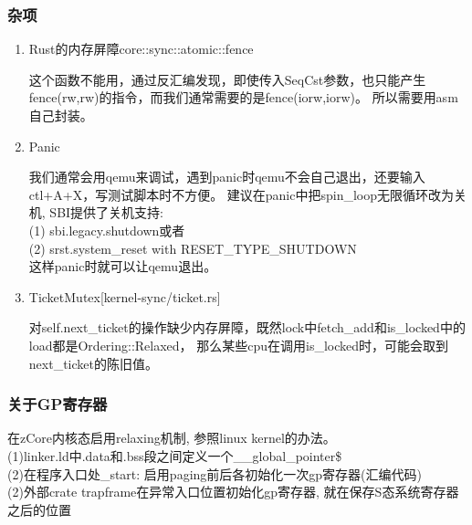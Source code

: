 \documentclass[
8pt, %
]{beamer}
\begin{document}
	\begin{frame}
		\frametitle{杂项}
		\begin{enumerate}
			\item Rust的内存屏障core::sync::atomic::fence\\
			\begin{block}{}
				这个函数不能用，通过反汇编发现，即使传入SeqCst参数，也只能产生fence(rw,rw)的指令，而我们通常需要的是fence(iorw,iorw)。
				所以需要用asm自己封装。
			\end{block}
			\item Panic\\
			\begin{block}{}
				我们通常会用qemu来调试，遇到panic时qemu不会自己退出，还要输入ctl+A+X，写测试脚本时不方便。
				建议在panic中把spin\_loop无限循环改为关机, SBI提供了关机支持:\\
                (1) sbi.legacy.shutdown或者\\
                (2) srst.system\_reset with RESET\_TYPE\_SHUTDOWN\\
                这样panic时就可以让qemu退出。
			\end{block}
			\item TicketMutex[kernel-sync/ticket.rs]
			\begin{block}{}
				对self.next\_ticket的操作缺少内存屏障，既然lock中fetch\_add和is\_locked中的load都是Ordering::Relaxed，
				那么某些cpu在调用is\_locked时，可能会取到next\_ticket的陈旧值。
			\end{block}
		\end{enumerate}
	\end{frame}

	\begin{frame}
		\frametitle{关于GP寄存器}
		在zCore内核态启用relaxing机制, 参照linux kernel的办法。\\
		(1)linker.ld中.data和.bss段之间定义一个\_\_global\_pointer\$\\
		(2)在程序入口处\_start: 启用paging前后各初始化一次gp寄存器(汇编代码)\\
		(2)外部crate trapframe在异常入口位置初始化gp寄存器, 就在保存S态系统寄存器之后的位置
        
        
	\end{frame}
\end{document}
